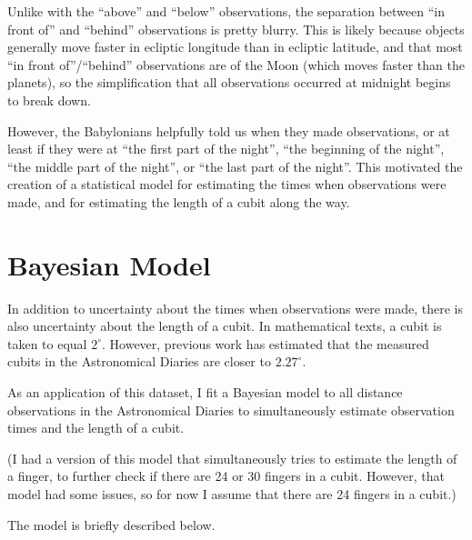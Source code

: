 \documentclass{article}
\begin{document}
Unlike with the ``above'' and ``below'' observations, the separation between ``in front of'' and ``behind'' observations is pretty blurry. This is likely because objects generally move faster in ecliptic longitude than in ecliptic latitude, and that most ``in front of''/``behind'' observations are of the Moon (which moves faster than the planets), so the simplification that all observations occurred at midnight begins to break down.

However, the Babylonians helpfully told us when they made observations, or at least if they were at ``the first part of the night'', ``the beginning of the night'', ``the middle part of the night'', or ``the last part of the night''. This motivated the creation of a statistical model for estimating the times when observations were made, and for estimating the length of a cubit along the way.

\section{Bayesian Model}
In addition to uncertainty about the times when observations were made, there is also uncertainty about the length of a cubit. In mathematical texts, a cubit is taken to equal $2^\circ$\autocite{sachsHunger}. However, previous work has estimated that the measured cubits in the Astronomical Diaries are closer to $2.27^\circ$\autocite{jones}.

As an application of this dataset, I fit a Bayesian model to all distance observations in the Astronomical Diaries to simultaneously estimate observation times and the length of a cubit.

(I had a version of this model that simultaneously tries to estimate the length of a finger, to further check if there are 24 or 30 fingers in a cubit. However, that model had some issues, so for now I assume that there are 24 fingers in a cubit.)

The model is briefly described below.
\end{document}
